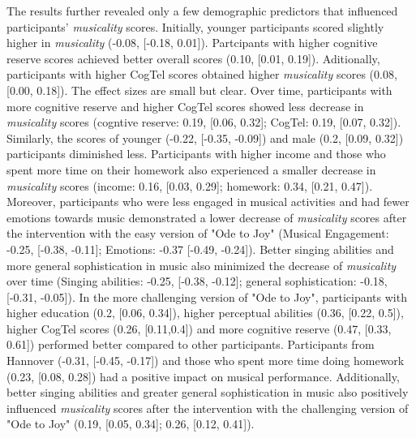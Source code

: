 The results further revealed only a few demographic predictors that influenced participants' \textit{musicality} scores. Initially, younger participants scored slightly higher in \textit{musicality} (-0.08, [-0.18, 0.01]). Partcipants with higher cognitive reserve scores achieved better overall scores (0.10, [0.01, 0.19]). Aditionally, participants with higher CogTel scores obtained higher \textit{musicality} scores (0.08, [0.00, 0.18]). The effect sizes are small but clear.
Over time, participants with more cognitive reserve and higher CogTel scores showed less decrease in \textit{musicality} scores (cogntive reserve: 0.19, [0.06, 0.32]; CogTel: 0.19, [0.07, 0.32]). Similarly, the scores of younger (-0.22, [-0.35, -0.09]) and male (0.2, [0.09, 0.32]) participants diminished less. Participants with higher income and those who spent more time on their homework also experienced a smaller decrease in \textit{musicality} scores (income: 0.16, [0.03, 0.29]; homework: 0.34, [0.21, 0.47]). Moreover, participants who were less engaged in musical activities and had fewer emotions towards music demonstrated a lower decrease of \textit{musicality} scores after the intervention with the easy version of "Ode to Joy" (Musical Engagement: -0.25, [-0.38, -0.11]; Emotions: -0.37 [-0.49, -0.24]). Better singing abilities and more general sophistication in music also minimized the decrease of \textit{musicality} over time (Singing abilities: -0.25, [-0.38, -0.12]; general sophistication: -0.18, [-0.31, -0.05]). 
In the more challenging version of "Ode to Joy", participants with higher education (0.2, [0.06, 0.34]), higher perceptual abilities (0.36, [0.22, 0.5]), higher CogTel scores (0.26, [0.11,0.4]) and more cognitive reserve (0.47, [0.33, 0.61]) performed better compared to other participants. Participants from Hannover (-0.31, [-0.45, -0.17]) and those who spent more time doing homework (0.23, [0.08, 0.28]) had a positive impact on musical performance. Additionally, better singing abilities and greater general sophistication in music also positively influenced \textit{musicality} scores after the intervention with the challenging version of "Ode to Joy" (0.19, [0.05, 0.34]; 0.26, [0.12, 0.41]).





